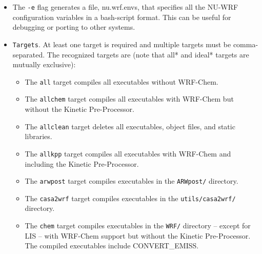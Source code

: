 \begin{itemize}
\begin{itemize}
    \item The \texttt{nest=n} option specifies compiling WRF with basic
      nesting (\texttt{n=1}), preset-moves nesting (\texttt{n=2}), or 
      vortex-tracking nesting (\texttt{n=3}). Basic nesting is assumed by 
      default. Note that WRF cannot be run coupled to LIS if preset-moves
      or vortex-tracking nesting is used. Similarly, WRF-Chem only runs
      with basic nesting.
            
  \end{itemize}

  \item The \texttt{-e} flag generates a file, nu.wrf.envs, that specifies
   all the NU-WRF configuration variables in a bash-script format.
   This can be useful for debugging or porting to other systems.
 
\item \texttt{Targets}. At least one target is required and multiple targets must be 
  comma-separated. The recognized targets are (note that all* and ideal* targets are 
  mutually exclusive):

  \begin{itemize}

  \item The \texttt{all} target compiles all executables without WRF-Chem.

  \item The \texttt{allchem} target compiles all executables with WRF-Chem but
    without the Kinetic Pre-Processor.

  \item The \texttt{allclean} target deletes all executables, object files,
    and static libraries.

  \item The \texttt{allkpp} target compiles all executables with WRF-Chem and
    including the Kinetic Pre-Processor.

  \item The \texttt{arwpost} target compiles executables in the 
    \texttt{ARWpost/} directory.

  \item The \texttt{casa2wrf} target compiles executables in the
    \texttt{utils/casa2wrf/} directory.

  \item The \texttt{chem} target compiles executables in the 
    \texttt{WRF/} directory -- except for LIS -- with WRF-Chem support but 
    without the Kinetic Pre-Processor. The compiled executables include 
    CONVERT\_EMISS.


\end{itemize}
\end{itemize}

